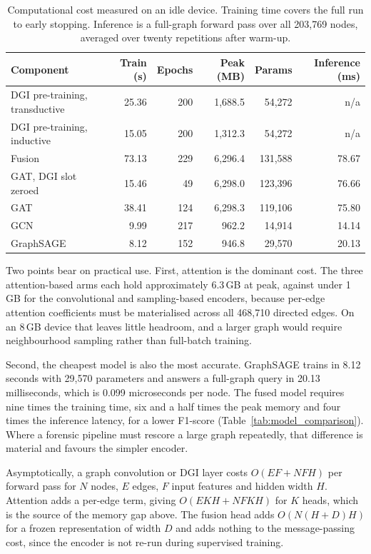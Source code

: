 \documentclass[12pt,a4paper]{article}
\begin{document}
\begin{table}[htbp]
\centering
\small
\caption{Computational cost measured on an idle device. Training
time covers the full run to early stopping. Inference is a
full-graph forward pass over all 203,769 nodes, averaged over
twenty repetitions after warm-up.}
\label{tab:compute_cost}
\begin{tabular}{lrrrrr}
\toprule
Component & Train (s) & Epochs & Peak (MB) & Params & Inference (ms) \\
\midrule
DGI pre-training, transductive & 25.36 & 200 & 1{,}688.5 & 54{,}272 & n/a \\
DGI pre-training, inductive    & 15.05 & 200 & 1{,}312.3 & 54{,}272 & n/a \\
\midrule
Fusion                & 73.13 & 229 & 6{,}296.4 & 131{,}588 & 78.67 \\
GAT, DGI slot zeroed  & 15.46 &  49 & 6{,}298.0 & 123{,}396 & 76.66 \\
GAT                   & 38.41 & 124 & 6{,}298.3 & 119{,}106 & 75.80 \\
GCN                   &  9.99 & 217 &   962.2 &  14{,}914 & 14.14 \\
GraphSAGE             &  8.12 & 152 &   946.8 &  29{,}570 & 20.13 \\
\bottomrule
\end{tabular}
\end{table}

Two points bear on practical use. First, attention is the
dominant cost. The three attention-based arms each hold
approximately 6.3\,GB at peak, against under 1\,GB for the
convolutional and sampling-based encoders, because per-edge
attention coefficients must be materialised across all 468,710
directed edges. On an 8\,GB device that leaves little headroom,
and a larger graph would require neighbourhood sampling rather
than full-batch training.

Second, the cheapest model is also the most accurate. GraphSAGE
trains in 8.12 seconds with 29,570 parameters and answers a
full-graph query in 20.13 milliseconds, which is 0.099
microseconds per node. The fused model requires nine times the
training time, six and a half times the peak memory and four
times the inference latency, for a lower F1-score
(Table~\ref{tab:model_comparison}). Where a forensic pipeline
must rescore a large graph repeatedly, that difference is
material and favours the simpler encoder.

Asymptotically, a graph convolution or DGI layer costs
$O(EF + NFH)$ per forward pass for $N$ nodes, $E$ edges, $F$
input features and hidden width $H$. Attention adds a per-edge
term, giving $O(EKH + NFKH)$ for $K$ heads, which is the source
of the memory gap above. The fusion head adds
$O(N(H+D)H)$ for a frozen representation of width $D$ and adds
nothing to the message-passing cost, since the encoder is not
re-run during supervised training.
\end{document}
